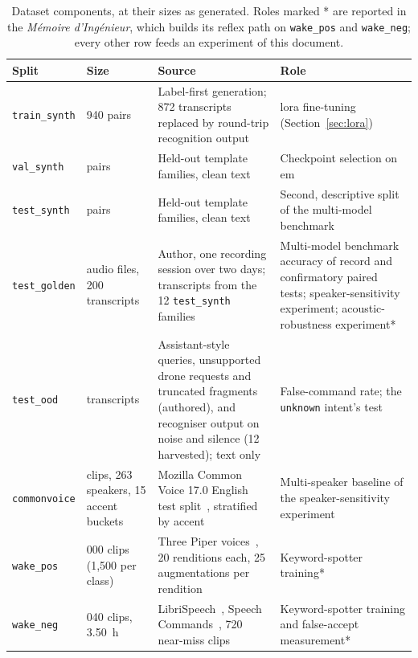 \begin{table}[htbp]
\centering
\footnotesize
\caption[Dataset components]{Dataset components, at their sizes as generated. Roles marked *
are reported in the \emph{M\'emoire d'Ing\'enieur}, which builds its reflex path on
\texttt{wake\_pos} and \texttt{wake\_neg}; every other row feeds an experiment of this document.}
\label{tab:dataset}
\begin{tabularx}{\textwidth}{@{}l >{\raggedright\arraybackslash}p{2.6cm} X X@{}}
\toprule
Split & Size & Source & Role \\
\midrule
\texttt{train\_synth} & 1{,}940 pairs & Label-first generation; 872 transcripts replaced by round-trip recognition output & \acrshort{lora} fine-tuning (Section~\ref{sec:lora}) \\
\texttt{val\_synth} & 240 pairs & Held-out template families, clean text & Checkpoint selection on \acrshort{em} \\
\texttt{test\_synth} & 240 pairs & Held-out template families, clean text & Second, descriptive split of the multi-model benchmark \\
\texttt{test\_golden} & 200 audio files, 200 transcripts & Author, one recording session over two days; transcripts from the 12 \texttt{test\_synth} families & Multi-model benchmark accuracy of record and confirmatory paired tests; speaker-sensitivity experiment; acoustic-robustness experiment* \\
\texttt{test\_ood} & 150 transcripts & Assistant-style queries, unsupported drone requests and truncated fragments (authored), and recogniser output on noise and silence (12 harvested); text only & False-command rate; the \texttt{unknown} intent's test \\
\texttt{commonvoice} & 300 clips, 263 speakers, 15 accent buckets & Mozilla Common Voice 17.0 English test split~\cite{commonvoice,commonvoice17}, stratified by accent & Multi-speaker baseline of the speaker-sensitivity experiment \\
\texttt{wake\_pos} & 3{,}000 clips (1{,}500 per class) & Three Piper voices~\cite{piper}, 20 renditions each, 25 augmentations per rendition & Keyword-spotter training* \\
\texttt{wake\_neg} & 5{,}040 clips, 3.50~h & LibriSpeech~\cite{librispeech}, Speech Commands~\cite{speechcmd}, 720 near-miss clips & Keyword-spotter training and false-accept measurement* \\
\bottomrule
\end{tabularx}
\end{table}

